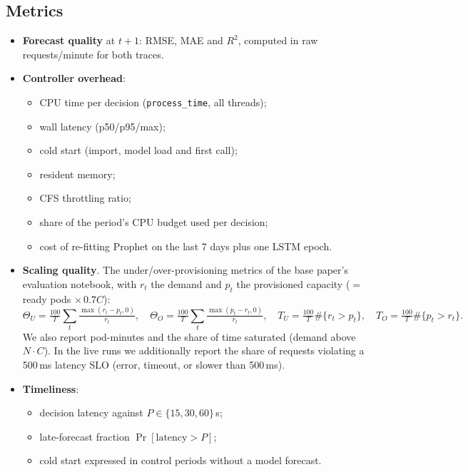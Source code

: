 \documentclass[11pt,a4paper]{article}
\begin{document}
\subsection{Metrics}
\begin{itemize}
\item \textbf{Forecast quality} at $t{+}1$: RMSE, MAE and $R^2$, computed in raw requests/minute for both traces.
\item \textbf{Controller overhead}:
      \begin{itemize}
      \item CPU time per decision (\texttt{process\_time}, all threads);
      \item wall latency (p50/p95/max);
      \item cold start (import, model load and first call);
      \item resident memory;
      \item CFS throttling ratio;
      \item share of the period's CPU budget used per decision;
      \item cost of re-fitting Prophet on the last 7 days plus one LSTM epoch.
      \end{itemize}
\item \textbf{Scaling quality}. The under/over-provisioning metrics of the base paper's evaluation notebook,
      with $r_t$ the demand and $p_t$ the provisioned capacity ($=$ ready pods $\times\,0.7C$):
      \[
      \Theta_U=\tfrac{100}{T}\sum_t \tfrac{\max(r_t-p_t,0)}{r_t},\quad
      \Theta_O=\tfrac{100}{T}\sum_t \tfrac{\max(p_t-r_t,0)}{r_t},\quad
      T_U=\tfrac{100}{T}\#\{r_t>p_t\},\quad T_O=\tfrac{100}{T}\#\{p_t>r_t\}.
      \]
      We also report pod-minutes and the share of time saturated (demand above $N\!\cdot\!C$). In the live runs
      we additionally report the share of requests violating a 500\,ms latency SLO (error, timeout, or
      slower than 500\,ms).
\item \textbf{Timeliness}:
      \begin{itemize}
      \item decision latency against $P\in\{15,30,60\}$\,s;
      \item late-forecast fraction $\Pr[\text{latency}>P]$;
      \item cold start expressed in control periods without a model forecast.
      \end{itemize}
\end{itemize}

\end{document}
